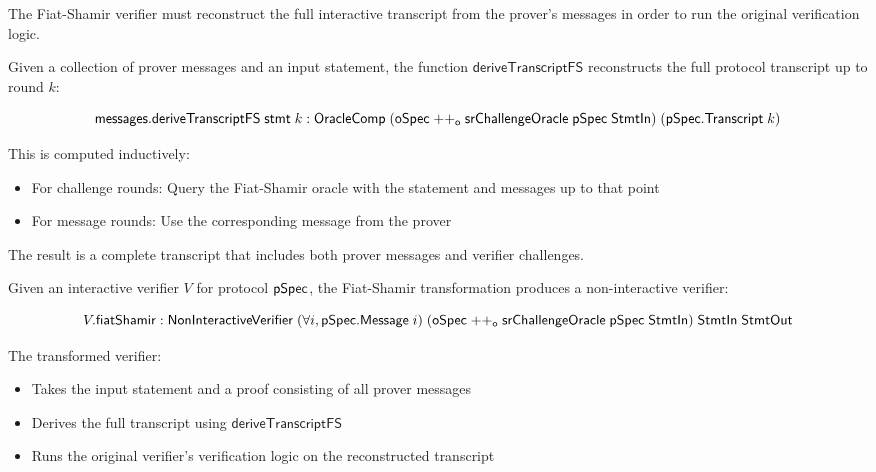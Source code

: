 The Fiat-Shamir verifier must reconstruct the full interactive transcript from the prover's messages in order to run the original verification logic.

\begin{definition}
    \label{def:derive_transcript_fs}
    Given a collection of prover messages and an input statement, the function $\mathsf{deriveTranscriptFS}$ reconstructs the full protocol transcript up to round $k$:

    \[ \mathsf{messages}.\mathsf{deriveTranscriptFS} \;\mathsf{stmt} \;k : \mathsf{OracleComp} \;(\mathsf{oSpec} \mathrel{++_\mathsf{o}} \mathsf{srChallengeOracle} \;\mathsf{pSpec} \;\mathsf{StmtIn}) \;(\mathsf{pSpec}.\mathsf{Transcript} \;k) \]

    This is computed inductively:
    \begin{itemize}
        \item For challenge rounds: Query the Fiat-Shamir oracle with the statement and messages up to that point
        \item For message rounds: Use the corresponding message from the prover
    \end{itemize}

    The result is a complete transcript that includes both prover messages and verifier challenges.
\end{definition}

\begin{definition}
    \label{def:verifier_fiat_shamir}
    Given an interactive verifier $V$ for protocol $\mathsf{pSpec}$, the Fiat-Shamir transformation produces a non-interactive verifier:

    \[ V.\mathsf{fiatShamir} : \mathsf{NonInteractiveVerifier} \;(\forall i, \mathsf{pSpec}.\mathsf{Message} \;i) \;(\mathsf{oSpec} \mathrel{++_\mathsf{o}} \mathsf{srChallengeOracle} \;\mathsf{pSpec} \;\mathsf{StmtIn}) \;\mathsf{StmtIn} \;\mathsf{StmtOut} \]

    The transformed verifier:
    \begin{itemize}
        \item Takes the input statement and a proof consisting of all prover messages
        \item Derives the full transcript using $\mathsf{deriveTranscriptFS}$
        \item Runs the original verifier's verification logic on the reconstructed transcript
    \end{itemize}
\end{definition}

